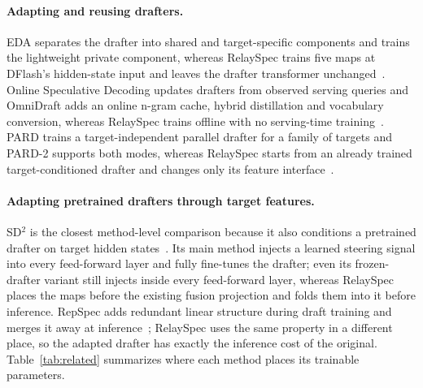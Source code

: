 \paragraph{Adapting and reusing drafters.}
EDA separates the drafter into shared and target-specific components and trains the lightweight private component, whereas RelaySpec trains five maps at DFlash's hidden-state input and leaves the drafter transformer unchanged~\citep{lin2026eda}. Online Speculative Decoding updates drafters from observed serving queries and OmniDraft adds an online n-gram cache, hybrid distillation and vocabulary conversion, whereas RelaySpec trains offline with no serving-time training~\citep{liu2024online,ramakrishnan2025omnidraft}. PARD trains a target-independent parallel drafter for a family of targets and PARD-2 supports both modes, whereas RelaySpec starts from an already trained target-conditioned drafter and changes only its feature interface~\citep{an2026pard,an2026pard2}.

\paragraph{Adapting pretrained drafters through target features.}
SD$^2$ is the closest method-level comparison because it also conditions a pretrained drafter on target hidden states~\citep{berdoz2026steering}. Its main method injects a learned steering signal into every feed-forward layer and fully fine-tunes the drafter; even its frozen-drafter variant still injects inside every feed-forward layer, whereas RelaySpec places the maps before the existing fusion projection and folds them into it before inference. RepSpec adds redundant linear structure during draft training and merges it away at inference~\citep{huo2026repspec}; RelaySpec uses the same property in a different place, so the adapted drafter has exactly the inference cost of the original. Table~\ref{tab:related} summarizes where each method places its trainable parameters.

